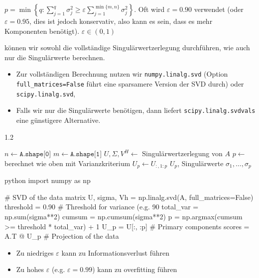  $\displaystyle p = \min\left\{ q : \sum_{j = 1}^{q} \sigma_j^2 \geq \varepsilon \sum_{j = 1}^{\min\{ m, n \}} \sigma_j^2 \right\}$.
Oft wird $\varepsilon = 0.90$ verwendet (oder $\varepsilon = 0.95$, dies ist jedoch konservativ, also kann es sein, dass es mehr Komponenten benötigt). $\varepsilon \in (0, 1)$


\innumpy können wir sowohl die vollständige Singulärwertzerlegung durchführen, wie auch nur die Singulärwerte berechnen.
\begin{itemize}
    \item Zur vollständigen Berechnung nutzen wir \texttt{numpy.linalg.svd} (Option \texttt{full\_matrices=False}
          führt eine sparsamere Version der SVD durch) oder \texttt{scipy.linalg.svd},
    \item Falls wir nur die Singulärwerte benötigen, dann liefert \texttt{scipy.linalg.svdvals} eine günstigere Alternative.
\end{itemize}

\begin{algorithm}
    \begin{spacing}{1.2}
        \caption{\textsc{PCA}($A$, $\varepsilon$)}
        \begin{algorithmic}[1]
            \State $n \gets \texttt{A.shape[0]}$
            \State $m \gets \texttt{A.shape[1]}$
            \State $U, \Sigma, V^H \gets$ Singulärwertzerlegung von $A$
            \State $p \gets$ berechnet wie oben mit Varianzkriterium
            \State $U_p \gets U_{:, 1:p}$ 
            \State \Return $U_p$, Singulärwerte $\sigma_1, \ldots, \sigma_p$
        \end{algorithmic}
    \end{spacing}
\end{algorithm}
\begin{code}{python}
import numpy as np

# SVD of the data matrix
U, sigma, Vh = np.linalg.svd(A, full_matrices=False)
threshold = 0.90 # Threshold for variance (e.g. 90%
total_var = np.sum(sigma**2)
cumsum = np.cumsum(sigma**2)
p = np.argmax(cumsum >= threshold * total_var) + 1
U_p = U[:, :p] # Primary components
scores = A.T @ U_p # Projection of the data
\end{code}

\begin{itemize}
    \item Zu niedriges $\varepsilon$ kann zu Informationsverlust führen
    \item Zu hohes $\varepsilon$ (e.g. $\varepsilon = 0.99$) kann zu overfitting führen
\end{itemize}

